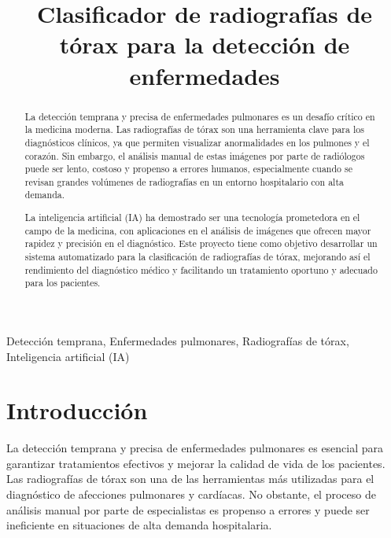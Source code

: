 \documentclass[conference]{IEEEtran}
\begin{document}
\title{Clasificador de radiografías de tórax para la detección de enfermedades\\

}

\author{
\and
{}
}

\maketitle

\begin{abstract}
La detección temprana y precisa de enfermedades pulmonares es un desafío crítico en la medicina moderna. Las radiografías de tórax son una herramienta clave para los diagnósticos clínicos, ya que permiten visualizar anormalidades en los pulmones y el corazón. Sin embargo, el análisis manual de estas imágenes por parte de radiólogos puede ser lento, costoso y propenso a errores humanos, especialmente cuando se revisan grandes volúmenes de radiografías en un entorno hospitalario con alta demanda.

La inteligencia artificial (IA) ha demostrado ser una tecnología prometedora en el campo de la medicina, con aplicaciones en el análisis de imágenes que ofrecen mayor rapidez y precisión en el diagnóstico. Este proyecto tiene como objetivo desarrollar un sistema automatizado para la clasificación de radiografías de tórax, mejorando así el rendimiento del diagnóstico médico y facilitando un tratamiento oportuno y adecuado para los pacientes.
\end{abstract}

\begin{IEEEkeywords}
Detección temprana, Enfermedades pulmonares, Radiografías de tórax, Inteligencia artificial (IA)
\end{IEEEkeywords}

\section{Introducción}
La detección temprana y precisa de enfermedades pulmonares es esencial para garantizar tratamientos efectivos y mejorar la calidad de vida de los pacientes. Las radiografías de tórax son una de las herramientas más utilizadas para el diagnóstico de afecciones pulmonares y cardíacas. No obstante, el proceso de análisis manual por parte de especialistas es propenso a errores y puede ser ineficiente en situaciones de alta demanda hospitalaria.
\end{document}
